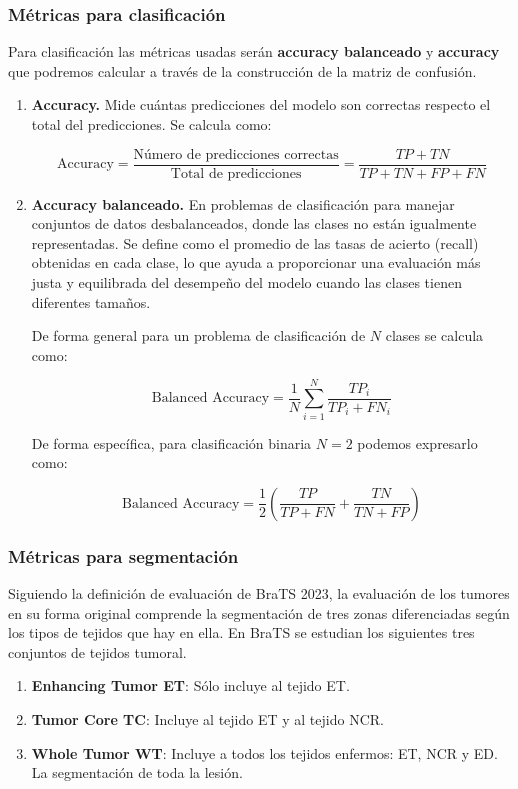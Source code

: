 \subsubsection{Métricas para clasificación}

Para clasificación las métricas usadas serán \textbf{accuracy balanceado} y \textbf{accuracy} que podremos calcular a través de la construcción de la matriz de confusión. 

\begin{enumerate}
	\item \textbf{Accuracy.} Mide cuántas predicciones del modelo son correctas respecto el total del predicciones. Se calcula como: 
	
	$$ \text{Accuracy} = \frac{\text{Número de predicciones correctas}}{\text{Total de predicciones}} = \frac{TP + TN}{TP + TN + FP + FN}$$
	
	\item \textbf{Accuracy balanceado.} En problemas de clasificación para manejar conjuntos de datos desbalanceados, donde las clases no están igualmente representadas. Se define como el promedio de las tasas de acierto (recall) obtenidas en cada clase, lo que ayuda a proporcionar una evaluación más justa y equilibrada del desempeño del modelo cuando las clases tienen diferentes tamaños.
	
	De forma general para un problema de clasificación de $N$ clases se calcula como:
	
	$$  \text{Balanced Accuracy} = \frac{1}{N} \sum_{i=1}^{N} \frac{TP_i}{TP_i + FN_i}$$
	
	De forma específica, para clasificación binaria $N = 2$ podemos expresarlo como:
	
	$$ \text{Balanced Accuracy} = \frac{1}{2} \left( \frac{TP}{TP + FN} + \frac{TN}{TN + FP} \right) $$ 
\end{enumerate}


\subsubsection{Métricas para segmentación}

Siguiendo la definición de evaluación de BraTS 2023, la evaluación de los tumores en su forma original comprende la segmentación de tres zonas diferenciadas según los tipos de tejidos que hay en ella. En BraTS se estudian los siguientes tres conjuntos de tejidos tumoral.

\begin{enumerate}
	\item \textbf{Enhancing Tumor ET}: Sólo incluye al tejido ET.
	\item \textbf{Tumor Core TC}: Incluye al tejido ET y al tejido NCR.
	\item \textbf{Whole Tumor WT}: Incluye a todos los tejidos enfermos: ET, NCR y ED. La segmentación de toda la lesión.
\end{enumerate}


